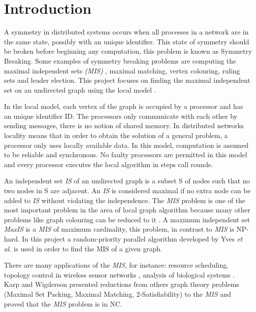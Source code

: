 \section{Introduction}
\label{cap:1}

A symmetry in distributed systems occurs when all processes in a network are in the same state, possibly with an unique identifier. This state of symmetry should be broken before beginning any computation, this problem is known as Symmetry Breaking. Some examples of symmetry breaking problems are computing the maximal independent sets \textit{(MIS)} , maximal matching, vertex colouring, ruling sets and leader election. This project focuses on finding the maximal independent set on an undirected graph using the local model \cite{linial1992locality}.

In the local model, each vertex of the graph is occupied by a processor and has an unique identifier ID. The processors only communicate with each other by sending messages, there is no notion of shared memory. In distributed networks locality means that in order to obtain the solution of a general problem, a processor only uses locally available data. In this model, computation is assumed to be reliable and synchronous. No faulty processors are permitted in this model and every processor executes the local algorithm in steps call rounds. 

An independent set \textit{IS} of an undirected graph is a subset S of nodes such that no two nodes in S are adjacent. An \textit{IS} is considered maximal if no extra node can be added to \textit{IS} without violating the independence. The \textit{MIS} problem is one of the most important problem in the area of local graph algorithm because many other problems like graph colouring can be reduced to it \cite{panconesi1992improved}. A maximum independent set \textit{MaxIS} is a \textit{MIS} of maximum cardinality, this problem, in contrast to \textit{MIS} is NP-hard. In this project a random-priority parallel algorithm developed by Yves \textit{et al.} \cite{yves2009optimal} is used in order to find the MIS of a given graph.


There are many applications of the \textit{MIS}, for instance: resource scheduling, topology control in wireless sensor networks \cite{basagni2001finding}, analysis of biological systems \cite{afek2013beeping}. Karp and Wigderson \cite{karp1986constructing} presented reductions from \newline others graph theory problems (Maximal Set Packing, Maximal Matching, 2-Satisfiability) to the \textit{MIS} and proved that the \textit{MIS} problem is in NC.


